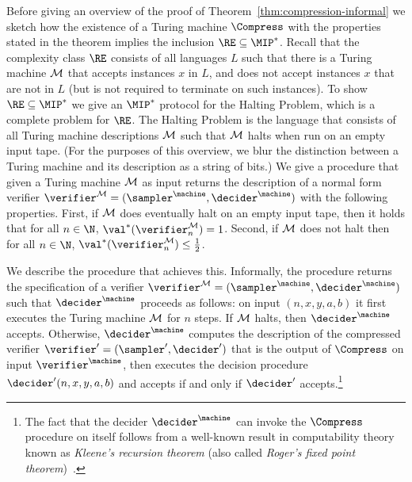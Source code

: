 Before giving an overview of the proof of Theorem~\ref{thm:compression-informal} we sketch how the existence of a Turing machine $\Compress$ with the properties stated in the theorem implies the inclusion $\RE\subseteq \MIP^*$. Recall that the complexity class $\RE$ consists of all languages $L$ such that there is a Turing machine $\cal{M}$ that accepts instances $x$ in $L$, and does not accept instances $x$ that are not in $L$ (but is not required to terminate on such instances). To show $\RE \subseteq \MIP^*$ we give an $\MIP^*$ protocol for the Halting Problem, which is a complete problem for $\RE$. The Halting Problem is the language that consists of all Turing machine descriptions $\cal{M}$ such that $\cal{M}$ halts when run on an empty input tape. (For the purposes of this overview, we blur the distinction between a Turing machine and its description as a string of bits.) We give a procedure that given a Turing machine $\cal{M}$ as input returns the description of a normal form verifier $\verifier^{\cal{M}} = (\sampler^\machine,\decider^\machine)$ with the following properties. First, if $\cal{M}$ does eventually halt on an empty input tape, then it holds that for all $n \in \N$, $\val^*(\verifier^{\cal{M}}_n) = 1$. Second, if $\cal{M}$ does not halt then for all $n \in \N$, $\val^*(\verifier^{\cal{M}}_n) \leq \frac{1}{2}$. 

We describe the procedure that achieves this. Informally, the procedure returns the specification of a verifier $\verifier^{\cal{M}} = (\sampler^\machine,\decider^\machine)$ such that $\decider^\machine$ proceeds as follows: on input $(n,x,y,a,b)$ it first executes the Turing machine $\cal{M}$ for $n$ steps. If $\cal{M}$ halts, then $\decider^\machine$ accepts. Otherwise, $\decider^\machine$ computes the description of the compressed verifier $\verifier' = (\sampler',\decider')$ that is the output of $\Compress$ on input $\verifier^\machine$, then executes the decision procedure $\decider'(n,x,y,a,b)$ and accepts if and only if $\decider'$ accepts.\footnote{The fact that the decider $\decider^\machine$ can invoke the $\Compress$ procedure on itself follows from a well-known result in computability theory known as \emph{Kleene's recursion theorem} (also called \emph{Roger's fixed point theorem})~\cite{Kleene1954,Rogers1987}.} 

